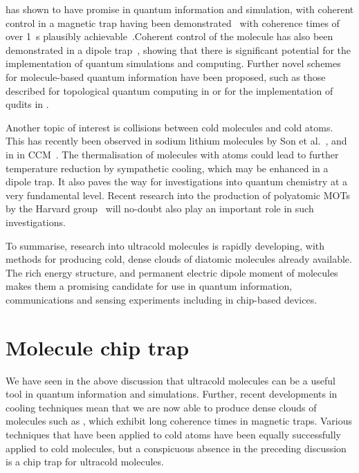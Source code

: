 \CaF{} has shown to have promise in quantum information and simulation, with
coherent control in a magnetic trap having been
demonstrated~\cite{WilliamsMagnetic2018, Blackmore_2018} with coherence times
of over \SI{1}{\second} plausibly
achievable~\cite{PhysRevLett.124.063001}.Coherent control of the molecule has
also been demonstrated in a dipole trap~\cite{PhysRevLett.127.123202}, showing
that there is significant potential for the implementation of quantum
simulations and computing. Further novel schemes for molecule-based quantum
information have been proposed, such as those described for topological quantum
computing in  or for the implementation of qudits in
.

Another topic of interest is collisions between cold molecules and cold atoms.
This has recently been observed in sodium lithium molecules by Son et
al.~\cite{son2019collisional}, and in \CaF{} in CCM~\cite{Jurgilas2021,
JurgilasPRL_2021}. The thermalisation of molecules with atoms could lead to
further temperature reduction by sympathetic cooling, which may be enhanced in
a dipole trap. It also paves the way for investigations into quantum chemistry
at a very fundamental level. Recent research into the production of polyatomic
MOTs by the Harvard group~\cite{DoylePolyatomic2022} will no-doubt also play an
important role in such investigations.

To summarise, research into ultracold molecules is rapidly developing, with
methods for producing cold, dense clouds of diatomic molecules already
available. The rich energy structure, and permanent electric dipole moment of
molecules makes them a promising candidate for use in quantum information,
communications and sensing experiments including in chip-based devices.

\section{Molecule chip trap}

We have seen in the above discussion that ultracold molecules can be a useful
tool in quantum information and simulations. Further, recent developments in
cooling techniques mean that we are now able to produce dense clouds of
molecules such as \CaF{}, which exhibit long coherence times in magnetic traps.
Various techniques that have been applied to cold atoms have been equally
successfully applied to cold molecules, but a conspicuous absence in the
preceding discussion is a chip trap for ultracold molecules.


